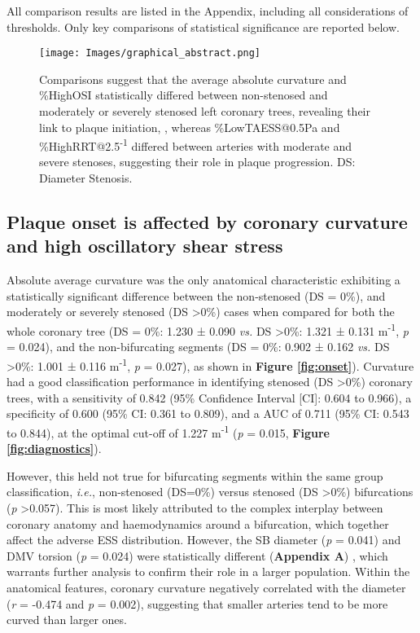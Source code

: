 \documentclass[preprint,11pt,review]{elsarticle}
\begin{document}
All comparison results are listed in the Appendix, including all considerations of thresholds. Only key comparisons of statistical significance are reported below. 

\begin{figure}
    \centering
    \texttt{[image: Images/graphical\_abstract.png]}
    \caption{Comparisons suggest that the average absolute curvature and \%HighOSI statistically differed between non-stenosed and moderately or severely stenosed left coronary trees, revealing their link to plaque initiation, , whereas \%LowTAESS@0.5Pa and \%HighRRT@2.5\textsuperscript{-1} differed between arteries with moderate and severe stenoses, suggesting their role in plaque progression. DS: Diameter Stenosis.}
    \label{fig:illustration}
\end{figure}

\subsection{Plaque onset is affected by coronary curvature and high oscillatory shear stress}

Absolute average curvature was the only anatomical characteristic exhibiting a statistically significant difference between the non-stenosed (DS = 0\%), and moderately or severely stenosed (DS \textgreater 0\%) cases when compared for both the whole coronary tree (DS = 0\%: 1.230 ± 0.090 \textit{vs.} DS \textgreater 0\%: 1.321 ± 0.131 m\textsuperscript{-1}, \textit{p} = 0.024), and the non-bifurcating segments (DS = 0\%: 0.902 ± 0.162 \textit{vs.} DS \textgreater 0\%: 1.001 ± 0.116 m\textsuperscript{-1}, \textit{p} = 0.027), as shown in \textbf{Figure \ref{fig:onset}}). Curvature had a good classification performance in identifying stenosed (DS \textgreater 0\%) coronary trees, with a sensitivity of 0.842 (95\% Confidence Interval [CI]: 0.604 to 0.966), a specificity of 0.600 (95\% CI: 0.361 to 0.809), and a AUC of 0.711 (95\% CI: 0.543 to 0.844), at the optimal cut-off of 1.227 m\textsuperscript{-1} (\textit{p} = 0.015, \textbf{Figure \ref{fig:diagnostics}}). 

However, this held not true for bifurcating segments within the same group classification, \textit{i.e.}, non-stenosed (DS=0\%) versus stenosed (DS \textgreater 0\%) bifurcations (\textit{p} \textgreater 0.057). This is most likely attributed to the complex interplay between coronary anatomy and haemodynamics around a bifurcation, which together affect the adverse ESS distribution. However, the SB diameter (\textit{p} = 0.041) and DMV torsion (\textit{p} = 0.024) were statistically different (\textbf{Appendix A}) , which warrants further analysis to confirm their role in a larger population. Within the anatomical features, coronary curvature negatively correlated with the diameter (\textit{r} = -0.474 and \textit{p} = 0.002), suggesting that smaller arteries tend to be more curved than larger ones. 
\end{document}
